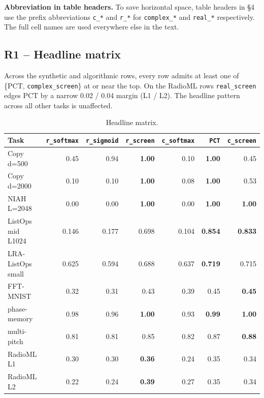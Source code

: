 \documentclass[11pt,a4paper]{article}
\theoremstyle{plain}
\theoremstyle{definition}
\begin{document}
\textbf{Abbreviation in table headers.} To save horizontal space, table headers in \S{}4 use the prefix abbreviations \texttt{c\_*} and \texttt{r\_*} for \texttt{complex\_*} and \texttt{real\_*} respectively. The full cell names are used everywhere else in the text.

\subsection{R1 -- Headline matrix}
Across the synthetic and algorithmic rows, every row admits at least one of \{PCT, \texttt{complex\_screen}\} at or near the top. On the RadioML rows \texttt{real\_screen} edges PCT by a narrow 0.02 / 0.04 margin (L1 / L2). The headline pattern across all other tasks is unaffected.

\begin{table}[H]
\centering
\footnotesize
\setlength{\tabcolsep}{3.5pt}
\renewcommand{\arraystretch}{1.1}
\begin{tabular}{|l|r|r|r|r|r|r|}
\hline
Task & \texttt{r\_softmax} & \texttt{r\_sigmoid} & \texttt{r\_screen} & \texttt{c\_softmax} & \texttt{PCT} & \texttt{c\_screen} \\
\hline
Copy d=500 & 0.45 & 0.94 & \textbf{1.00} & 0.10 & \textbf{1.00} & 0.45 \\
\hline
Copy d=2000 & 0.10 & 0.10 & \textbf{1.00} & 0.08 & \textbf{1.00} & 0.53 \\
\hline
NIAH L=2048 & 0.00 & 0.00 & \textbf{1.00} & 0.00 & \textbf{1.00} & \textbf{1.00} \\
\hline
ListOps mid L1024 & 0.146 & 0.177 & 0.698 & 0.104 & \textbf{0.854} & \textbf{0.833} \\
\hline
LRA-ListOps small & 0.625 & 0.594 & 0.688 & 0.637 & \textbf{0.719} & 0.715 \\
\hline
FFT-MNIST & 0.32 & 0.31 & 0.43 & 0.39 & 0.45 & \textbf{0.45} \\
\hline
phase-memory & 0.98 & 0.96 & \textbf{1.00} & 0.93 & \textbf{0.99} & \textbf{1.00} \\
\hline
multi-pitch & 0.81 & 0.81 & 0.85 & 0.82 & 0.87 & \textbf{0.88} \\
\hline
RadioML L1 & 0.30 & 0.30 & \textbf{0.36} & 0.24 & 0.35 & 0.34 \\
\hline
RadioML L2 & 0.22 & 0.24 & \textbf{0.39} & 0.27 & 0.35 & 0.34 \\
\hline
\end{tabular}
\caption{Headline matrix.}
\end{table}
\end{document}
